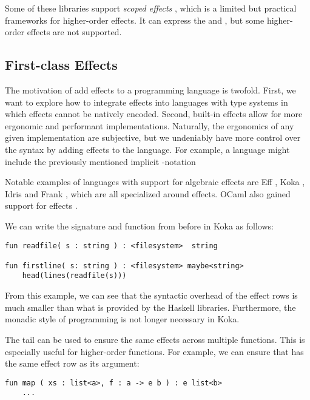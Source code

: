 Some of these libraries support \emph{scoped effects} \autocite{wu_effect_2014}, which is a limited but practical frameworks for higher-order effects. It can express the \olocal and \ocatch, but some higher-order effects are not supported.

\subsection{First-class Effects}

The motivation of add effects to a programming language is twofold. First, we want to explore how to integrate effects into languages with type systems in which effects cannot be natively encoded. Second, built-in effects allow for more ergonomic and performant implementations. Naturally, the ergonomics of any given implementation are subjective, but we undeniably have more control over the syntax by adding effects to the language. For example, a language might include the previously mentioned implicit -notation

Notable examples of languages with support for algebraic effects are Eff \autocite{bauer_programming_2015}, Koka \autocite{leijen_koka_2014}, Idris \autocite{brady_programming_2013} and Frank \autocite{lindley_be_2017}, which are all specialized around effects. OCaml also gained support for effects \autocite{sivaramakrishnan_retrofitting_2021}.

We can write the  signature and  function from before in Koka as follows:
\begin{lstlisting}[language={},style=fancy]
fun readfile( s : string ) : <filesystem>  string

fun firstline( s: string ) : <filesystem> maybe<string>
    head(lines(readfile(s)))
\end{lstlisting}
From this example, we can see that the syntactic overhead of the effect rows is much smaller than what is provided by the Haskell libraries. Furthermore, the monadic style of programming is not longer necessary in Koka.

The tail can be used to ensure the same effects across multiple functions. This is especially useful for higher-order functions. For example, we can ensure that  has the same effect row as its argument:
\begin{lstlisting}[language={},style=fancy]
fun map ( xs : list<a>, f : a -> e b ) : e list<b>
    ...
\end{lstlisting}

